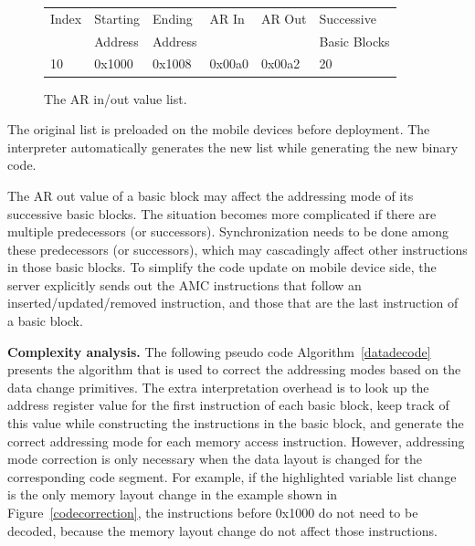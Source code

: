 \begin{figure}[htdp]

\begin{center}
\begin{small}
\begin{tabular}{p{0.5in}p{1in}p{1in}p{1in}p{1in}p{1in}}
\hline
Index & Starting  & Ending  & AR In & AR Out & Successive \\
&Address&Address & & &Basic Blocks\\
\hline\hline
10 & 0x1000 & 0x1008 & 0x00a0 & 0x00a2 & 20\\ \hline
\end{tabular}
\end{small}
\end{center}
\caption{The AR in/out value list.}
\label{bbtable}
\end{figure}%

The original list is preloaded on the mobile devices before deployment. The interpreter automatically generates the new list while generating the new binary code. 

The AR out value of a basic block may affect the addressing mode of its successive basic blocks. The situation becomes more complicated if there are multiple predecessors (or successors). Synchronization needs to be done among these predecessors (or successors), which may cascadingly affect other instructions in those basic blocks. To simplify the code update on mobile device side, the server explicitly sends out the AMC instructions that follow an inserted/updated/removed instruction, and those that are the last instruction of a basic block.

{\bf Complexity analysis.}
The following pseudo code Algorithm~\ref{datadecode} presents the algorithm that is used to correct the addressing modes based on the data change primitives. The extra interpretation overhead is to look up the address register value for the first instruction of each basic block, keep track of this value while constructing the instructions in the basic block, and generate the correct addressing mode for each memory access instruction. However, addressing mode correction is only necessary 
when the data layout is changed for the corresponding code segment. For example, if the highlighted variable list change is the only memory layout change in the example shown in Figure~\ref{codecorrection}, the instructions before 0x1000 do not need to be decoded, because the memory layout change do not affect those instructions.



